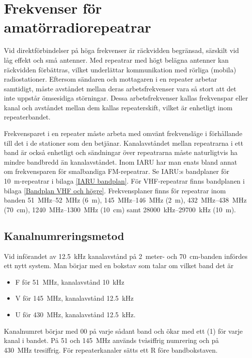 \chapter[Svenska repeatrar]{Frekvenser för amatörradiorepeatrar}
\label{svenska repeatrar}

Vid direktförbindelser på höga frekvenser är räckvidden begränsad,
särskilt vid låg effekt och små antenner.
Med repeatrar med högt belägna antenner kan räckvidden förbättras,
vilket underlättar kommunikation med rörliga (mobila) radiostationer.
Eftersom sändaren och mottagaren i en repeater arbetar samtidigt, måste
avståndet mellan deras arbetsfrekvenser vara så stort att det inte uppstår
ömsesidiga störningar.
Dessa arbetsfrekvenser kallas frekvenspar eller kanal och avståndet mellan dem
kallas repeaterskift, vilket är enhetligt inom repeaterbandet.

Frekvensparet i en repeater måste arbeta med omvänt frekvensläge i förhållande
till det i de stationer som den betjänar.
Kanalavståndet mellan repeatrarna i ett band är också enhetligt och sändningar
över repeatrarna måste naturligtvis ha mindre bandbredd än kanalavståndet.
Inom IARU har man enats bland annat om frekvensparen för smalbandiga
FM-repeatrar.
Se IARU:s bandplaner för \SI{10}{\metre}-repeatrar i bilaga \ref{IARU bandplan}.
För VHF-repeatrar finns bandplanen i bilaga \ref{Bandplan VHF och högre}.
Frekvensplaner finns för repeatrar inom banden \SIrange{51}{52}{\mega\hertz}
(\SI{6}{\metre}), \SIrange{145}{146}{\mega\hertz} (\SI{2}{\metre}),
\SIrange{432}{438}{\mega\hertz} (\SI{70}{\centi\metre}),
\SIrange{1240}{1300}{\mega\hertz} (\SI{10}{\centi\metre}) samt
\SIrange{28000}{29700}{\kilo\hertz} (\SI{10}{\metre}).

\section{Kanalnumreringsmetod}
Vid införandet av \SI{12,5}{\kilo\hertz} kanalavstånd på 2~meter- och
\SI{70}{\centi\metre}-banden infördes ett nytt system.
Man börjar med en bokstav som talar om vilket band det är
\begin{itemize}
  \item F för \SI{51}{\mega\hertz}, kanalavstånd \SI{10}{\kilo\hertz}
  \item V för \SI{145}{\mega\hertz}, kanalavstånd \SI{12,5}{\kilo\hertz}
  \item U för \SI{430}{\mega\hertz}, kanalavstånd \SI{12,5}{\kilo\hertz}.
\end{itemize}
Kanalnumret börjar med 00 på varje sådant band och ökar med ett (1) för varje
kanal i bandet.
På 51 och \SI{145}{\mega\hertz} används tvåsiffrig numrering och på
\SI{430}{\mega\hertz} tresiffrig.
För repeaterkanaler sätts ett R före bandbokstaven.

